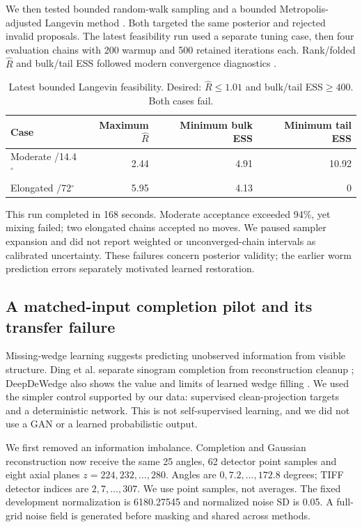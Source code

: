 \documentclass[11pt,a4paper]{article}
\newcommand{\degree}{\ensuremath{^{\circ}}}
\begin{document}
We then tested bounded random-walk sampling and a bounded Metropolis-adjusted Langevin method \cite{mala}. Both targeted the same posterior and rejected invalid proposals. The latest feasibility run used a separate tuning case, then four evaluation chains with 200 warmup and 500 retained iterations each. Rank/folded $\widehat R$ and bulk/tail ESS followed modern convergence diagnostics \cite{rhat}.
\begin{table}[H]\centering\small
\caption{Latest bounded Langevin feasibility. Desired: $\widehat R\leq1.01$ and bulk/tail ESS$\geq400$. Both cases fail.}
\begin{tabular}{lrrr}\toprule
Case & Maximum $\widehat R$ & Minimum bulk ESS & Minimum tail ESS\\\midrule
Moderate /14.4\degree{} &2.44&4.91&10.92\\
Elongated /72\degree{} &5.95&4.13&0\\\bottomrule
\end{tabular}\end{table}
This run completed in 168 seconds. Moderate acceptance exceeded 94\%, yet mixing failed; two elongated chains accepted no moves. We paused sampler expansion and did not report weighted or unconverged-chain intervals as calibrated uncertainty. These failures concern posterior validity; the earlier worm prediction errors separately motivated learned restoration.

\newpage
\subsection{A matched-input completion pilot and its transfer failure}
Missing-wedge learning suggests predicting unobserved information from visible structure. Ding et al. separate sinogram completion from reconstruction cleanup \cite{ding}; DeepDeWedge also shows the value and limits of learned wedge filling \cite{ddw}. We used the simpler control supported by our data: supervised clean-projection targets and a deterministic network. This is not self-supervised learning, and we did not use a GAN or a learned probabilistic output.

We first removed an information imbalance. Completion and Gaussian reconstruction now receive the same 25 angles, 62 detector point samples and eight axial planes $z=224,232,\ldots,280$. Angles are $0,7.2,\ldots,172.8$ degrees; TIFF detector indices are $2,7,\ldots,307$. We use point samples, not averages. The fixed development normalization is 6180.27545 and normalized noise SD is 0.05. A full-grid noise field is generated before masking and shared across methods.
\end{document}
